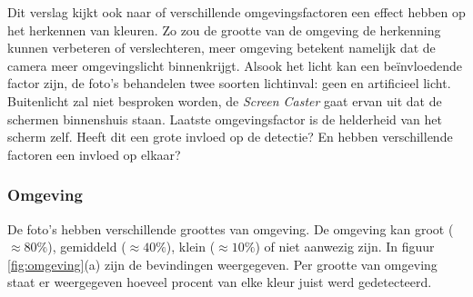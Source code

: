 Dit verslag kijkt ook naar of verschillende omgevingsfactoren een effect hebben op het herkennen van kleuren. Zo zou de grootte van de omgeving de herkenning kunnen verbeteren of verslechteren, meer omgeving betekent namelijk dat de camera meer omgevingslicht binnenkrijgt. Alsook het licht kan een beïnvloedende factor zijn, de foto's behandelen twee soorten lichtinval: geen en artificieel licht. Buitenlicht zal niet besproken worden, de {\it Screen Caster} gaat ervan uit dat de schermen binnenshuis staan. Laatste omgevingsfactor is de helderheid van het scherm zelf. Heeft dit een grote invloed op de detectie? En hebben verschillende factoren een invloed op elkaar?

\subsubsection{Omgeving}
De foto's hebben verschillende groottes van omgeving. De omgeving kan groot ($\approx 80\%$), gemiddeld ($\approx 40\%$), klein ($\approx 10\%$) of niet aanwezig zijn. In figuur \ref{fig:omgeving}(a) zijn de bevindingen weergegeven. Per grootte van omgeving staat er weergegeven hoeveel procent van elke kleur juist werd gedetecteerd.

